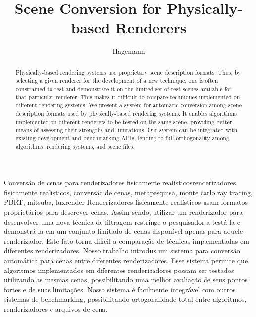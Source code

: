 \documentclass[cic,tc,english]{iiufrgs}
\title{Scene Conversion for Physically-based Renderers}
\author{Hagemann}{Luiza de Azambuja}
\begin{document}
\maketitle




\begin{abstract}
Physically-based rendering systems use proprietary scene description formats. Thus, by selecting a given renderer for the development of a new technique, one is often constrained to test and demonstrate it on the limited set of test scenes available for that particular renderer. This makes it difficult to compare techniques implemented on different rendering systems. 
We present a system for automatic conversion among scene description formats used by physically-based rendering systems. 
It enables algorithms implemented on different renderers to be tested on the same scene, providing better means of assessing their strengths and limitations. 
Our system can be integrated with existing development and benchmarking APIs, lending to full orthogonality among algorithms, rendering systems, and scene files.
\end{abstract}

\begin{englishabstract}{Conversão de cenas para renderizadores fisicamente realísticos}{renderizadores fisicamente realísticos, conversão de cenas, metapesquisa, monte carlo ray tracing, PBRT, mitsuba, luxrender}
Renderizadores fisicamente realísticos usam formatos proprietários para descrever cenas. Assim sendo, utilizar um renderizador para desenvolver uma nova técnica de filtragem restringe o pesquisador a testá-la e demonstrá-la em um conjunto limitado de cenas disponível apenas para aquele renderizador. Este fato torna difícil a comparação de técnicas implementadas em diferentes renderizadores. Nosso trabalho introduz um sistema para conversão automática para cenas entre diferentes renderizadores. Esse sistema permite que algoritmos implementados em diferentes renderizadores possam ser testados utilizando as mesmas cenas, possibilitando uma melhor avaliação de seus pontos fortes e de suas limitações. Nosso sistema é facilmente integrável com outros sistemas de benchmarking, possibilitando ortogonalidade total entre algoritmos, renderizadores e arquivos de cena.
\end{englishabstract}
\end{document}
